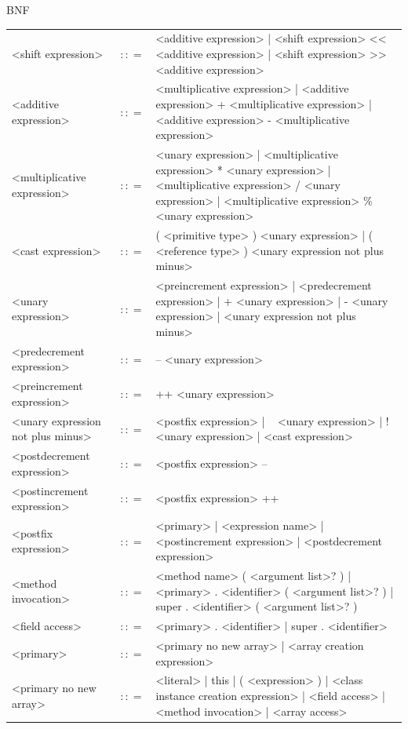 \documentclass[landscape, 11pt]{article}
\begin{document}
\begin{qsection}{BNF}
\begin{enumerate}[label=\bt{\theenumi.}]
\begin{longtable}{R{7cm} c L{15cm}}
				\\
				<shift expression>							&	$\colon\colon=$	&	<additive expression> | <shift expression> << <additive expression> | <shift expression> >> <additive expression>
				\\
				<additive expression>						&	$\colon\colon=$	&	<multiplicative expression> | <additive expression> + <multiplicative expression> | <additive expression> - <multiplicative expression>
				\\
				<multiplicative expression>					&	$\colon\colon=$	&	<unary expression> | <multiplicative expression> * <unary expression> | <multiplicative expression> / <unary expression> | <multiplicative expression> \% <unary expression>
				\\
				<cast expression>							&	$\colon\colon=$	&	( <primitive type> ) <unary expression> | ( <reference type> ) <unary expression not plus minus>
				\\
				<unary expression>							&	$\colon\colon=$	&	<preincrement expression> | <predecrement expression> | + <unary expression> | - <unary expression> | <unary expression not plus minus>
				\\
				<predecrement expression>					&	$\colon\colon=$	&	-- <unary expression>
				\\
				<preincrement expression>					&	$\colon\colon=$	&	++ <unary expression>
				\\
				<unary expression not plus minus>			&	$\colon\colon=$	&	<postfix expression> | ~ <unary expression> | ! <unary expression> | <cast expression>
				\\
				<postdecrement expression>					&	$\colon\colon=$	&	<postfix expression> --
				\\
				<postincrement expression>					&	$\colon\colon=$	&	<postfix expression> ++
				\\
				<postfix expression>						&	$\colon\colon=$	&	<primary> | <expression name> | <postincrement expression> | <postdecrement expression>
				\\
				<method invocation>							&	$\colon\colon=$	&	<method name> ( <argument list>? ) | <primary> . <identifier> ( <argument list>? ) | super . <identifier> ( <argument list>? )
				\\
				<field access>								&	$\colon\colon=$	&	<primary> . <identifier> | super . <identifier>
				\\
				<primary>									&	$\colon\colon=$	&	<primary no new array> | <array creation expression>
				\\
				<primary no new array>						&	$\colon\colon=$	&	<literal> | this | ( <expression> ) | <class instance creation expression> | <field access> | <method invocation> | <array access>

\end{longtable}
\end{enumerate}
\end{qsection}
\end{document}
